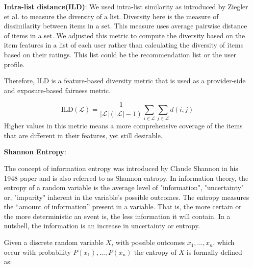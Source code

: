 
        \textbf{Intra-list distance(ILD)}: We used intra-list similarity as introduced by Ziegler et al. \cite{ziegler2005improving} to measure the diversity of a list. Diversity here is the measure of dissimilarity between items in a set. This measure uses average pairwise distance of items in a set. We adjusted this metric to compute the diversity based on the item features in a list of each user rather than calculating the diversity of items based on their ratings. This list could be the recommendation list or the user profile.
        
        Therefore, ILD is a feature-based diversity metric that is used as a provider-side and exposure-based fairness metric.
        
        
        \begin{equation}
            \text{ILD}(\mathcal{L}) = \frac{1} {|\mathcal{L}|(|\mathcal{L}|-1)} \sum_{i \in \mathcal{L}}\sum_{j \in \mathcal{L}}d(i,j)
        \end{equation}
        Higher values in this metric means a more comprehensive coverage of the items that are different in their features, yet still desirable.




        \textbf{Shannon Entropy}:
        
        The concept of information entropy was introduced by Claude Shannon in his 1948 paper \cite{entropy1948} and is also referred to as Shannon entropy. In information theory, the entropy of a random variable is the average level of "information", "uncertainty" or, "impurity" inherent in the variable's possible outcomes. The entropy measures the “amount of information” present in a variable. That is, the more certain or the more deterministic an event is, the less information it will contain. In a nutshell, the information is an increase in uncertainty or entropy. 
        
        Given a discrete random variable $X$, with possible outcomes $x_{1},...,x_{n}$, which occur with probability $P(x_1),...,P(x_n)$
         the entropy of $X$ is formally defined as:
         
